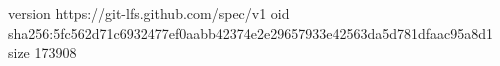version https://git-lfs.github.com/spec/v1
oid sha256:5fc562d71c6932477ef0aabb42374e2e29657933e42563da5d781dfaac95a8d1
size 173908
